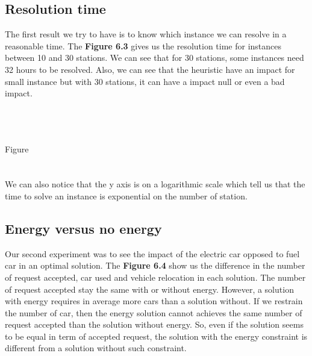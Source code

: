 \begin{bibunit}[ieeetr]
\subsection{Resolution time}
The first result we try to have is to know which instance we can resolve in a reasonable time.
The \textbf{Figure 6.3} gives us the resolution time for instances between 10 and 30 stations.
We can see that for 30 stations, some instances need 32 hours to be resolved.
Also, we can see that the heuristic have an impact for small instance but with 30 stations, it can have a impact null or even a bad impact. 

~\\~\\~\\Figure\\~\\~\\

We can also notice that the y axis is on a logarithmic scale which tell us that the time to solve an instance is exponential on the number of station.

\subsection{Energy versus no energy}
Our second experiment was to see the impact of the electric car opposed to fuel car in an optimal solution.
The \textbf{Figure 6.4} show us the difference in the number of request accepted, car used and vehicle relocation in each solution.
The number of request accepted stay the same with or without energy.
However, a solution with energy requires in average more cars  than a solution without.
If we restrain the number of car, then the energy solution cannot achieves the same number of request accepted than the solution without energy.
So, even if the solution seems to be equal in term of accepted request, the solution with  the energy constraint is different from a solution without such constraint.


\end{bibunit}
